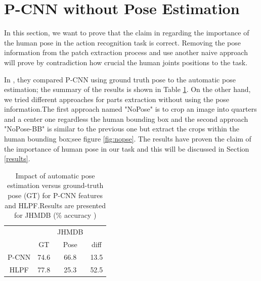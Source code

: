 \documentclass[10pt,twocolumn,letterpaper]{article}
\begin{document}
\section{P-CNN without Pose Estimation}

In this section, we want to prove that the claim in \cite{cheron2015p} regarding the importance of the human pose in the action recognition task is correct. Removing the pose information from the patch extraction process and use another naive approach will prove by contradiction how crucial the human joints positions to the task. 

In \cite{cheron2015p}, they compared P-CNN using ground truth pose to the automatic pose estimation; the summary of the results is shown in Table \ref{table:pose}. On the other hand, we tried different approaches for parts extraction without using the pose information.The first approach named "NoPose" is to crop an image into quarters and a center one regardless the human bounding box and the second approach "NoPose-BB" is similar to the previous one but extract the crops within the human bounding box;see figure \ref{fig:nopse}. The results have proven the claim of the importance of human pose in our task and this will be discussed in Section \ref{results}.

\begin{table}
	
	\begin{center}
		\begin{tabular}{cccc}
			\hline
			& & JHMDB\\ [0.5ex] 
			\cline{2-4}
			 & GT & Pose\cite{cherian2014mixing} & diff \\ [0.5ex]
			\hline
			P-CNN & 74.6 & 66.8 & 13.5\\
			HLPF  & 77.8 & 25.3 & 52.5\\
			\hline
		\end{tabular}
	\end{center}
	\caption{Impact of automatic pose estimation versus
		ground-truth pose (GT) for P-CNN features and HLPF\cite{jhuang2013towards}.Results are presented for JHMDB (\% accuracy )}
	\label{table:pose}
\end{table}
\end{document}
